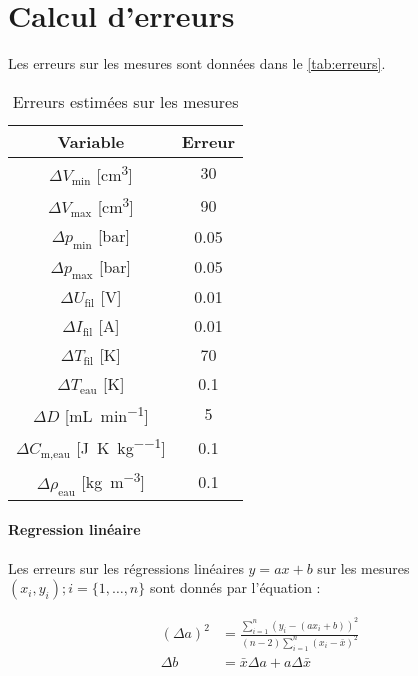 \section{Calcul d'erreurs}
\label{sec:erreurs}

Les erreurs sur les mesures sont données dans le \autoref{tab:erreurs}.

\begin{table}[h]
    \centering
    \begin{tabulary}{\textwidth}{C C}
        \toprule
        Variable & Erreur \\
        \midrule
        \(\Delta V_\textrm{min}\) [\si{\centi\meter\cubed}] & 30 \\
        \(\Delta V_\textrm{max}\) [\si{\centi\meter\cubed}] & 90 \\
        \(\Delta p_\textrm{min}\) [\si{\bar}] & 0.05 \\
        \(\Delta p_\textrm{max}\) [\si{\bar}] & 0.05 \\
        \(\Delta U_\textrm{fil}\) [\si{\volt}] & 0.01 \\
        \(\Delta I_\textrm{fil}\) [\si{\ampere}] & 0.01 \\
        \(\Delta T_\textrm{fil}\) [\si{\kelvin}] & 70 \\
        \(\Delta T_\textrm{eau}\) [\si{\kelvin}] & 0.1 \\
        \(\Delta D\) [\si{\milli\liter \per \minute}] & 5 \\
        \(\Delta C_\textrm{m,eau}\) [\si{\joule\per\kelvin\per\kilo\gram}] & 0.1 \\
        \(\Delta \rho_\textrm{eau}\) [\si{\kilo\gram\per\meter\cubed}] & 0.1 \\
        \bottomrule
    \end{tabulary}
    \caption{Erreurs estimées sur les mesures}
    \label{tab:erreurs}
\end{table}

\paragraph*{Regression linéaire}
Les erreurs sur les régressions linéaires \(y = ax + b\) sur les mesures \((x_i, y_i) ; i = \{1, \hdots, n\}\) sont donnés par l'équation \cite{erreursmesure}:

\begin{equation}
    \label{eq:erreur:fit}
    \begin{aligned}
        (\Delta a)^2 &= \frac{\sum_{i=1}^{n}(y_i - (a x_i + b))^2}{(n-2) \sum_{i=1}^{n}(x_i - \bar{x})^2}\\
        \Delta b &= \bar{x} \Delta a + a \Delta \bar{x}
    \end{aligned}
\end{equation}

